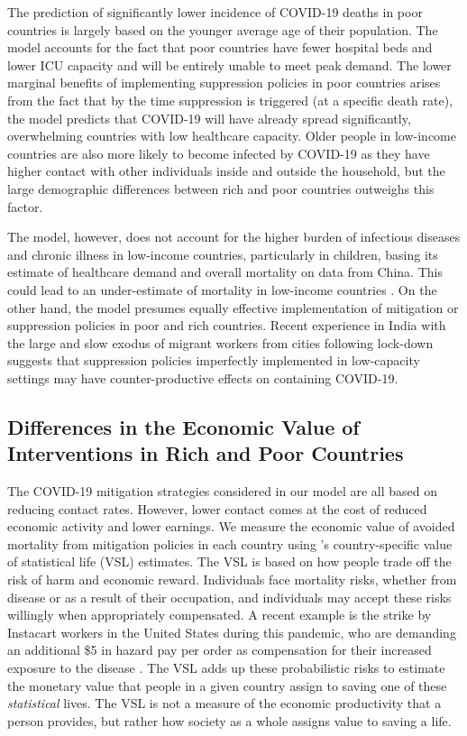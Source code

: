 \documentclass[11pt]{article}
\begin{document}
The prediction of significantly lower incidence of COVID-19 deaths in poor countries is largely based on the younger average age of their population. The model accounts for the fact that poor countries have fewer hospital beds and lower ICU capacity and will be entirely unable to meet peak demand. The lower marginal benefits of implementing suppression policies in poor countries arises from the fact that by the time suppression is triggered (at a specific death rate), the model predicts that COVID-19 will have already spread significantly, overwhelming countries with low healthcare capacity. Older people in low-income countries are also more likely to become infected by COVID-19 as they have higher contact with other individuals inside and outside the household, but the large demographic differences between rich and poor countries outweighs this factor.

The model, however, does not account for the higher burden of infectious diseases and chronic illness in low-income countries, particularly in children, basing its estimate of healthcare demand and overall mortality on data from China. This could lead to an under-estimate of mortality in low-income countries \parencite{walker2020}. On the other hand, the model presumes equally effective implementation of mitigation or suppression policies in poor and rich countries. Recent experience in India with the large and slow exodus of migrant workers from cities following lock-down suggests that suppression policies imperfectly implemented in low-capacity settings may have counter-productive effects on containing COVID-19.

\subsection{Differences in the Economic Value of Interventions in Rich and Poor Countries}

The COVID-19 mitigation strategies considered in our model are all based on reducing contact rates. However, lower contact comes at the cost of reduced economic activity and lower earnings. We measure the economic value of avoided mortality from mitigation policies in each country using \textcite{viscusi2017}'s country-specific value of statistical life (VSL) estimates. The VSL is based on how people trade off the risk of harm and economic reward. Individuals face mortality risks, whether from disease or as a result of their occupation, and individuals may accept these risks willingly when appropriately compensated. A recent example is the strike by Instacart workers in the United States during this pandemic, who are demanding an additional \$5 in hazard pay per order as compensation for their increased exposure to the disease \parencite{wapo2020}. The VSL adds up these probabilistic risks to estimate the monetary value that people in a given country assign to saving one of these \textit{statistical} lives. The VSL is not a measure of the economic productivity that a person provides, but rather how society as a whole assigns value to saving a life.
\end{document}
